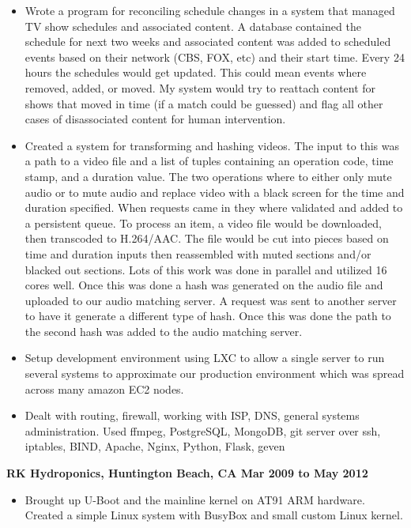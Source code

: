 \documentclass{res}
\begin{document}
\begin{resume}
\begin{itemize}
\item
	Wrote a program for reconciling schedule changes in a system that
	managed TV show schedules and associated content.  A database
	contained the schedule for next two weeks and associated content
	was added to scheduled events based on their network (CBS, FOX,
	etc) and their start time.  Every 24 hours the schedules would
	get updated.  This could mean events where removed, added,
	or moved.  My system would try to reattach content for shows
	that moved in time (if a match could be guessed) and flag all
	other cases of disassociated content for human intervention.
\item
	Created a system for transforming and hashing videos.  The
	input to this was a path to a video file and a list of tuples
	containing an operation code, time stamp, and a duration value.
	The two operations where to either only mute audio or to mute
	audio and replace video with a black screen for the time and
	duration specified.  When requests came in they where validated
	and added to a persistent queue.  To process an item, a video
	file would be downloaded, then transcoded to H.264/AAC.  The file
	would be cut into pieces based on time and duration inputs then
	reassembled with muted sections and/or blacked out sections.
	Lots of this work was done in parallel and utilized 16 cores well.
	Once this was done a hash was generated on the audio file and
	uploaded to our audio matching server.	A request was sent to
	another server to have it generate a different type of hash.
	Once this was done the path to the second hash was added to the
	audio matching server.

\item
	Setup  development  environment using LXC to allow a single
	server to run several systems to approximate our production
	environment which was spread across many amazon EC2 nodes.

\item
	Dealt with routing, firewall, working with ISP, DNS, general
	systems administration.  Used ffmpeg, PostgreSQL, MongoDB,
	git server over ssh, iptables, BIND, Apache, Nginx, Python,
	Flask, geven

\end{itemize}


{\large \bf RK Hydroponics, Huntington Beach, CA \hfill Mar 2009 to
May 2012}

\begin{itemize}

\item
	Brought up U-Boot and the mainline kernel on AT91 ARM hardware.
	Created a simple Linux system with BusyBox and small custom
	Linux kernel.


\end{itemize}
\end{resume}
\end{document}
